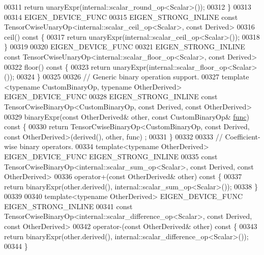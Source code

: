 \begin{DoxyCode}
00311       \textcolor{keywordflow}{return} unaryExpr(internal::scalar\_round\_op<Scalar>());
00312     \}
00313 
00314     EIGEN\_DEVICE\_FUNC
00315     EIGEN\_STRONG\_INLINE \textcolor{keyword}{const} TensorCwiseUnaryOp<internal::scalar\_ceil\_op<Scalar>, \textcolor{keyword}{const} Derived>
00316     ceil()\textcolor{keyword}{ const }\{
00317       \textcolor{keywordflow}{return} unaryExpr(internal::scalar\_ceil\_op<Scalar>());
00318     \}
00319 
00320     EIGEN\_DEVICE\_FUNC
00321     EIGEN\_STRONG\_INLINE \textcolor{keyword}{const} TensorCwiseUnaryOp<internal::scalar\_floor\_op<Scalar>, \textcolor{keyword}{const} Derived>
00322     floor()\textcolor{keyword}{ const }\{
00323       \textcolor{keywordflow}{return} unaryExpr(internal::scalar\_floor\_op<Scalar>());
00324     \}
00325 
00326     \textcolor{comment}{// Generic binary operation support.}
00327     \textcolor{keyword}{template} <\textcolor{keyword}{typename} CustomBinaryOp, \textcolor{keyword}{typename} OtherDerived> EIGEN\_DEVICE\_FUNC
00328     EIGEN\_STRONG\_INLINE \textcolor{keyword}{const} TensorCwiseBinaryOp<CustomBinaryOp, const Derived, const OtherDerived>
00329     binaryExpr(\textcolor{keyword}{const} OtherDerived& other, \textcolor{keyword}{const} CustomBinaryOp& \hyperlink{structfunc}{func})\textcolor{keyword}{ const }\{
00330       \textcolor{keywordflow}{return} TensorCwiseBinaryOp<CustomBinaryOp, const Derived, const OtherDerived>(derived(), other, func)
      ;
00331     \}
00332 
00333     \textcolor{comment}{// Coefficient-wise binary operators.}
00334     \textcolor{keyword}{template}<\textcolor{keyword}{typename} OtherDerived> EIGEN\_DEVICE\_FUNC EIGEN\_STRONG\_INLINE
00335     \textcolor{keyword}{const} TensorCwiseBinaryOp<internal::scalar\_sum\_op<Scalar>, \textcolor{keyword}{const} Derived, \textcolor{keyword}{const} OtherDerived>
00336     operator+(\textcolor{keyword}{const} OtherDerived& other)\textcolor{keyword}{ const }\{
00337       \textcolor{keywordflow}{return} binaryExpr(other.derived(), internal::scalar\_sum\_op<Scalar>());
00338     \}
00339 
00340     \textcolor{keyword}{template}<\textcolor{keyword}{typename} OtherDerived> EIGEN\_DEVICE\_FUNC EIGEN\_STRONG\_INLINE
00341     \textcolor{keyword}{const} TensorCwiseBinaryOp<internal::scalar\_difference\_op<Scalar>, \textcolor{keyword}{const} Derived, \textcolor{keyword}{const} OtherDerived>
00342     operator-(\textcolor{keyword}{const} OtherDerived& other)\textcolor{keyword}{ const }\{
00343       \textcolor{keywordflow}{return} binaryExpr(other.derived(), internal::scalar\_difference\_op<Scalar>());
00344     \}

\end{DoxyCode}
